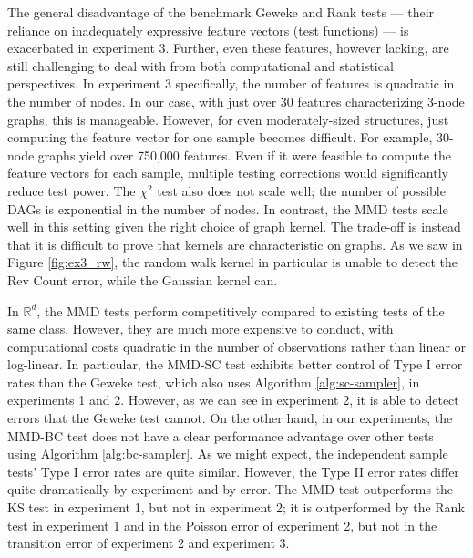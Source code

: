 \documentclass[a4paper,11pt]{article}
\begin{document}
The general disadvantage of the benchmark Geweke and Rank tests --- their reliance on inadequately expressive feature vectors (test functions) --- is exacerbated in experiment 3. Further, even these features, however lacking, are still challenging to deal with from both computational and statistical perspectives. In experiment 3 specifically, the number of features is quadratic in the number of nodes. In our case, with just over 30 features characterizing 3-node graphs, this is manageable. However, for even moderately-sized structures, just computing the feature vector for one sample becomes difficult. For example, 30-node graphs yield over 750,000 features. Even if it were feasible to compute the feature vectors for each sample, multiple testing corrections would significantly reduce test power. The $\chi^{2}$ test also does not scale well; the number of possible DAGs is exponential in the number of nodes. In contrast, the MMD tests scale well in this setting given the right choice of graph kernel. The trade-off is instead that it is difficult to prove that kernels are characteristic on graphs. As we saw in Figure \ref{fig:ex3_rw}, the random walk kernel in particular is unable to detect the Rev Count error, while the Gaussian kernel can.

In $\mathbb{R}^{d}$, the MMD tests perform competitively compared to existing tests of the same class. However, they are much more expensive to conduct, with computational costs quadratic in the number of observations rather than linear or log-linear. In particular, the MMD-SC test exhibits better control of Type I error rates than the Geweke test, which also uses Algorithm \ref{alg:sc-sampler}, in experiments 1 and 2. However, as we can see in experiment 2, it is able to detect errors that the Geweke test cannot. On the other hand, in our experiments, the MMD-BC test does not have a clear performance advantage over other tests using Algorithm \ref{alg:bc-sampler}. As we might expect, the independent sample tests' Type I error rates are quite similar. However, the Type II error rates differ quite dramatically by experiment and by error. The MMD test outperforms the KS test in experiment 1, but not in experiment 2; it is outperformed by the Rank test in experiment 1 and in the Poisson error of experiment 2, but not in the transition error of experiment 2 and experiment 3. 
\end{document}
